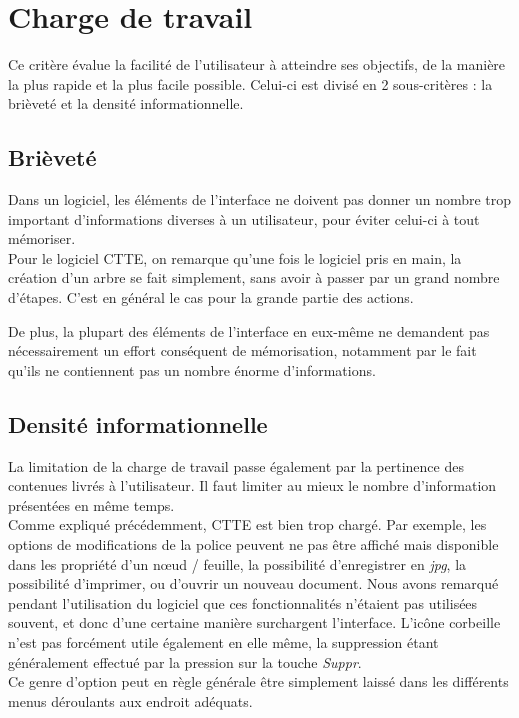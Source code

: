 \documentclass[12pt, a4paper]{article}
\begin{document}
\section{Charge de travail}
Ce critère évalue la facilité de l'utilisateur à atteindre ses objectifs, de la manière la plus rapide et la plus facile possible. Celui-ci est divisé en 2 sous-critères : la brièveté et la densité informationnelle.

\subsection{Brièveté}
Dans un logiciel, les éléments de l'interface ne doivent pas donner un nombre trop important d'informations diverses à un utilisateur, pour éviter celui-ci à tout mémoriser.\\


Pour le logiciel CTTE, on remarque qu'une fois le logiciel pris en main, la création d'un arbre se fait simplement, sans avoir à passer par un grand nombre d'étapes. C'est en général le cas pour la grande partie des actions. 


De plus, la plupart des éléments de l'interface en eux-même ne demandent pas nécessairement un effort conséquent de mémorisation, notamment par le fait qu'ils ne contiennent pas un nombre énorme d'informations.

\subsection{Densité informationnelle}
La limitation de la charge de travail passe également par la pertinence des contenues livrés à l'utilisateur. Il faut limiter au mieux le nombre d'information présentées en même temps.\\


Comme expliqué précédemment, CTTE est bien trop chargé. Par exemple, les options de modifications de la police peuvent ne pas être affiché mais disponible dans les propriété d'un nœud / feuille, la possibilité d'enregistrer en \emph{jpg}, la possibilité d'imprimer, ou d'ouvrir un nouveau document. Nous avons remarqué pendant l'utilisation du logiciel que ces fonctionnalités n'étaient pas utilisées souvent, et donc d'une certaine manière surchargent l'interface. L'icône corbeille n'est pas forcément utile également en elle même, la suppression étant généralement effectué par la pression sur la touche \emph{Suppr}. \\


Ce genre d'option peut en règle générale être simplement laissé dans les différents menus déroulants aux endroit adéquats.
\end{document}
